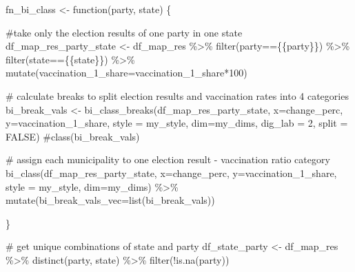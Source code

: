 \documentclass[
  letterpaper,
  DIV=11,
  numbers=noendperiod,
  oneside]{scrartcl}
\newenvironment{Shaded}{\begin{snugshade}}{\end{snugshade}}
\newcommand{\AttributeTok}[1]{\textcolor[rgb]{0.40,0.45,0.13}{#1}}
\newcommand{\CommentTok}[1]{\textcolor[rgb]{0.37,0.37,0.37}{#1}}
\newcommand{\ConstantTok}[1]{\textcolor[rgb]{0.56,0.35,0.01}{#1}}
\newcommand{\ControlFlowTok}[1]{\textcolor[rgb]{0.00,0.23,0.31}{#1}}
\newcommand{\DecValTok}[1]{\textcolor[rgb]{0.68,0.00,0.00}{#1}}
\newcommand{\FunctionTok}[1]{\textcolor[rgb]{0.28,0.35,0.67}{#1}}
\newcommand{\NormalTok}[1]{\textcolor[rgb]{0.00,0.23,0.31}{#1}}
\newcommand{\OtherTok}[1]{\textcolor[rgb]{0.00,0.23,0.31}{#1}}
\newcommand{\SpecialCharTok}[1]{\textcolor[rgb]{0.37,0.37,0.37}{#1}}
\begin{document}
\begin{Shaded}
\begin{Highlighting}[]
\NormalTok{fn\_bi\_class }\OtherTok{\textless{}{-}} \ControlFlowTok{function}\NormalTok{(party, state) \{}

\CommentTok{\#take only the election results of one party in one state }
\NormalTok{    df\_map\_res\_party\_state }\OtherTok{\textless{}{-}}\NormalTok{ df\_map\_res }\SpecialCharTok{\%\textgreater{}\%}
       \FunctionTok{filter}\NormalTok{(party}\SpecialCharTok{==}\NormalTok{\{\{party\}\}) }\SpecialCharTok{\%\textgreater{}\%}
       \FunctionTok{filter}\NormalTok{(state}\SpecialCharTok{==}\NormalTok{\{\{state\}\}) }\SpecialCharTok{\%\textgreater{}\%}
    \FunctionTok{mutate}\NormalTok{(}\AttributeTok{vaccination\_1\_share=}\NormalTok{vaccination\_1\_share}\SpecialCharTok{*}\DecValTok{100}\NormalTok{)}

\CommentTok{\# calculate breaks to split election results and vaccination rates into 4 categories     }
\NormalTok{    bi\_break\_vals }\OtherTok{\textless{}{-}} \FunctionTok{bi\_class\_breaks}\NormalTok{(df\_map\_res\_party\_state,}
      \AttributeTok{x=}\NormalTok{change\_perc,}
      \AttributeTok{y=}\NormalTok{vaccination\_1\_share,}
      \AttributeTok{style =}\NormalTok{ my\_style,}
      \AttributeTok{dim=}\NormalTok{my\_dims,}
      \AttributeTok{dig\_lab =} \DecValTok{2}\NormalTok{,}
      \AttributeTok{split =} \ConstantTok{FALSE}\NormalTok{)}
    \CommentTok{\#class(bi\_break\_vals)}
 
\CommentTok{\# assign each municipality to one election result {-} vaccination ratio category}
   \FunctionTok{bi\_class}\NormalTok{(df\_map\_res\_party\_state, }
            \AttributeTok{x=}\NormalTok{change\_perc, }
            \AttributeTok{y=}\NormalTok{vaccination\_1\_share, }
            \AttributeTok{style =}\NormalTok{ my\_style, }
            \AttributeTok{dim=}\NormalTok{my\_dims) }\SpecialCharTok{\%\textgreater{}\%} 
     \FunctionTok{mutate}\NormalTok{(}\AttributeTok{bi\_break\_vals\_vec=}\FunctionTok{list}\NormalTok{(bi\_break\_vals))}
   
\NormalTok{    \}}

\CommentTok{\# get unique combinations of state and party}
\NormalTok{df\_state\_party }\OtherTok{\textless{}{-}}\NormalTok{ df\_map\_res }\SpecialCharTok{\%\textgreater{}\%} 
  \FunctionTok{distinct}\NormalTok{(party, state) }\SpecialCharTok{\%\textgreater{}\%} 
  \FunctionTok{filter}\NormalTok{(}\SpecialCharTok{!}\FunctionTok{is.na}\NormalTok{(party))}


\end{Highlighting}
\end{Shaded}
\end{document}
